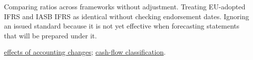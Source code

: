\begin{qfdefinition}
 Comparing ratios across frameworks without adjustment. Treating EU-adopted IFRS and IASB IFRS as identical without checking endorsement dates. Ignoring an issued standard because it is not yet effective when forecasting statements that will be prepared under it.

 \hyperref[meth:accounting-change-effects]{effects of accounting changes}; \hyperref[meth:statement-linked-cash-flows]{cash-flow classification}.

\end{qfdefinition}
